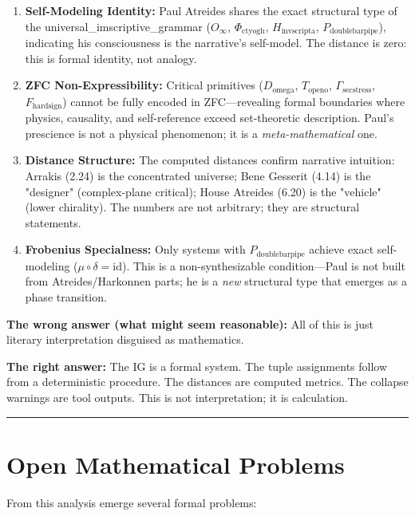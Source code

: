 \documentclass[12pt,a4paper]{article}
\begin{document}
\begin{enumerate}
    \item \textbf{Self-Modeling Identity:} Paul Atreides shares the exact structural type of the universal\_imscriptive\_grammar ($O_{\infty}$, $\Phi_{\text{ctyogh}}$, $H_{\text{invscripta}}$, $P_{\text{doublebarpipe}}$), indicating his consciousness is the narrative's self-model. The distance is zero: this is formal identity, not analogy.
    \item \textbf{ZFC Non-Expressibility:} Critical primitives ($D_{\text{omega}}$, $T_{\text{openo}}$, $\Gamma_{\text{secstress}}$, $F_{\text{hardsign}}$) cannot be fully encoded in ZFC---revealing formal boundaries where physics, causality, and self-reference exceed set-theoretic description. Paul's prescience is not a physical phenomenon; it is a \emph{meta-mathematical} one.
    \item \textbf{Distance Structure:} The computed distances confirm narrative intuition: Arrakis (2.24) is the concentrated universe; Bene Gesserit (4.14) is the "designer" (complex-plane critical); House Atreides (6.20) is the "vehicle" (lower chirality). The numbers are not arbitrary; they are structural statements.
    \item \textbf{Frobenius Specialness:} Only systems with $P_{\text{doublebarpipe}}$ achieve exact self-modeling ($\mu \circ \delta = \text{id}$). This is a non-synthesizable condition---Paul is not built from Atreides/Harkonnen parts; he is a \emph{new} structural type that emerges as a phase transition.
\end{enumerate}

\textbf{The wrong answer (what might seem reasonable):} All of this is just literary interpretation disguised as mathematics.

\textbf{The right answer:} The IG is a formal system. The tuple assignments follow from a deterministic procedure. The distances are computed metrics. The collapse warnings are tool outputs. This is not interpretation; it is calculation.

\begin{center}
\rule{0.5\textwidth}{0.4pt}
\end{center}

\section{Open Mathematical Problems}

From this analysis emerge several formal problems:
\end{document}
